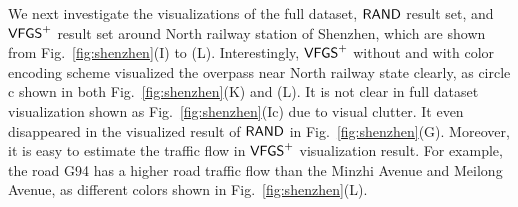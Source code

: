 We next investigate the visualizations of the full dataset, $\mathsf{RAND}$ result set, and $\mathsf{VFGS}^{+}$ result set around North railway station of Shenzhen, which are shown from Fig.~\ref{fig:shenzhen}(I) to (L).
Interestingly, $\mathsf{VFGS}^{+}$ without and with color encoding scheme visualized the overpass near North railway state clearly, as circle c shown in both Fig.~\ref{fig:shenzhen}(K) and (L).
It is not clear in full dataset visualization shown as Fig.~\ref{fig:shenzhen}(Ic) due to visual clutter.
It even disappeared in the visualized result of $\mathsf{RAND}$ in Fig.~\ref{fig:shenzhen}(G).
Moreover, it is easy to estimate the traffic flow in $\mathsf{VFGS}^{+}$ visualization result.
For example, the road G94 has a higher road traffic flow than the Minzhi Avenue and Meilong Avenue, as different colors shown in Fig.~\ref{fig:shenzhen}(L).









